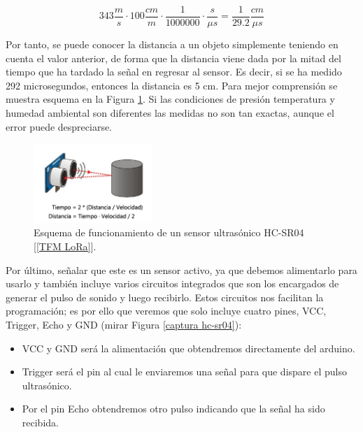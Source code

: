 \documentclass[12pt]{article}
\begin{document}
	\begin{equation} \label{Cálculo multiplicador HC-SR04}
		343 \frac{m}{s} \cdot 100 \frac{cm}{m} \cdot \frac{1}{1000000} \cdot \frac{s}{\mu s} = \frac{1}{29.2} \frac{cm}{\mu s}
	\end{equation}
	
	\noindent Por tanto, se puede conocer la distancia a un objeto simplemente teniendo en cuenta
el valor anterior, de forma que la distancia viene dada por la mitad del tiempo que ha
tardado la señal en regresar al sensor. Es decir, si se ha medido 292 microsegundos,
entonces la distancia es 5 cm. Para mejor comprensión se muestra esquema en la
Figura \ref{esquema funcionamiento hc-sr04}. Si las condiciones de presión temperatura y humedad ambiental son
diferentes las medidas no son tan exactas, aunque el error puede despreciarse. \\
	
	
	\begin{figure}[h]
		\begin{center}
			\includegraphics[width=0.4\textwidth]{img/esquema_funcionamiento_hcsr04.png}
			\caption{Esquema de funcionamiento de un sensor ultrasónico HC-SR04 [\ref{TFM LoRa}].}
			\label{esquema funcionamiento hc-sr04}
		\end{center}
	\end{figure}

	\noindent Por último, señalar que este es un sensor activo, ya que debemos alimentarlo para usarlo y también incluye varios circuitos integrados que son los encargados de generar el pulso de sonido y luego recibirlo. Estos circuitos nos facilitan la programación; es por ello que veremos que solo incluye cuatro pines, VCC, Trigger, Echo y GND (mirar Figura \ref{captura hc-sr04}):
	
	\begin{itemize}
		\item VCC y GND será la alimentación que obtendremos directamente del arduino. 
		\item Trigger será el pin al cual le enviaremos una señal para que dispare el pulso ultrasónico. 
		\item Por el pin Echo obtendremos otro pulso indicando que la señal ha sido recibida.
	\end{itemize}
	
\end{document}
